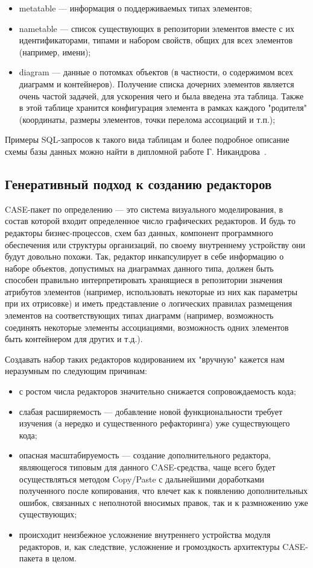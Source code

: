 \documentclass[a5paper]{article}
\begin{document}
\begin{itemize}
  \item metatable --– информация о поддерживаемых типах элементов;
  \item nametable --– список существующих в репозитории
	элементов вместе с их идентификаторами, типами и набором свойств, общих
	для всех элементов (например, имени);
  \item diagram --– данные о потомках объектов (в
	частности, о содержимом всех диаграмм и контейнеров). Получение списка
	дочерних элементов является очень частой задачей, для ускорения чего и
	была введена эта таблица. Также в этой таблице хранится конфигурация
	элемента в рамках каждого "родителя" (координаты, размеры элементов,
	точки перелома ассоциаций и т.п.);
\end{itemize}

Примеры SQL-запросов к такого вида таблицам
и более подробное описание схемы базы данных можно найти в дипломной
работе Г. Никандрова~\cite{nikandrov}.

\subsection{Генеративный подход к созданию редакторов}

CASE-пакет по определению –-- это система
визуального моделирования, в состав которой входит определенное число
графических редакторов. И будь то редакторы бизнес-процессов, схем баз
данных, компонент программного обеспечения или структуры организаций,
по своему внутреннему устройству они будут довольно похожи. Так,
редактор инкапсулирует в себе информацию о наборе объектов, допустимых
на диаграммах данного типа, должен быть способен правильно
интерпретировать хранящиеся в репозитории значения атрибутов элементов
(например, использовать некоторые из них как параметры при их
отрисовке) и иметь представление о логических правилах размещения
элементов на соответствующих типах диаграмм (например, возможность
соединять некоторые элементы ассоциациями, возможность одних элементов
быть контейнером для других и т.д.).

Создавать набор таких редакторов кодированием их "вручную" кажется нам
неразумным по следующим причинам:

\begin{itemize}
  \item с ростом числа редакторов значительно снижается сопровождаемость кода;
  \item слабая расширяемость --– добавление новой функциональности требует
	изучения (а нередко и существенного рефакторинга) уже существующего
	кода;
  \item опасная масштабируемость --– создание дополнительного редактора,
	являющегося типовым для данного CASE-средства, чаще всего будет
	осуществляться методом Copy/Paste с
	дальнейшими доработками полученного после копирования, что влечет как к
	появлению дополнительных ошибок, связанных с неполнотой вносимых
	правок, так и к размножению уже существующих;
  \item происходит неизбежное усложнение внутреннего устройства модуля
	редакторов, и, как следствие, усложнение и громоздкость архитектуры
	CASE-пакета в целом.
\end{itemize}
\end{document}
